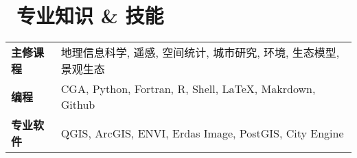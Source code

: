\section{\texorpdfstring{\faLaptop\ 专业知识 \& 技能}{专业知识 \& 技能}}
\begin{tabular}{p{} p{}}
\textbf{主修课程} & 地理信息科学, 遥感, 空间统计, 城市研究, 环境, 生态模型, 景观生态\\
\textbf{编程} & CGA, Python, Fortran, R, Shell, LaTeX, Makrdown, Github \\
\textbf{专业软件} & QGIS, ArcGIS, ENVI, Erdas Image, PostGIS, City Engine \\
\end{tabular}
